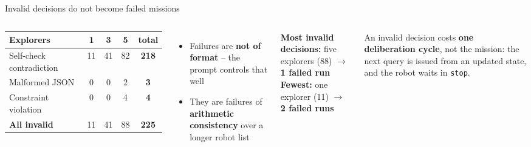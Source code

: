\documentclass[aspectratio=169,10pt]{beamer}
\newcommand{\callout}[2][upmblue]{%
  \begin{beamercolorbox}[wd=\linewidth,sep=6pt,rounded=false]{}%
    \color{#1}\small #2%
  \end{beamercolorbox}%
}
\begin{document}
\begin{frame}{Invalid decisions do not become failed missions}
  \begin{columns}[T]
  \vspace{-2pt}
  \footnotesize
  \begin{tabular}{@{}lcccc@{}}
    \toprule
    \textbf{\color{upmnavy}Explorers} & 1 & 3 & 5 & \textbf{total} \\
    \midrule
    Self-check contradiction & 11 & 41 & 82 & \textbf{218} \\
    Malformed JSON           &  0 &  0 &  2 & \textbf{3}  \\
    Constraint violation     &  0 &  0 &  4 & \textbf{4}  \\
    \midrule
    \textbf{All invalid}     & 11 & 41 & 88 & \textbf{225} \\
    \bottomrule
  \end{tabular}
  \vspace{6pt}
  \begin{itemize}\small
    \item Failures are \textbf{not of format} -- the prompt controls that
      well
    \item They are failures of \textbf{arithmetic consistency} over a
      longer robot list
  \end{itemize}
  \vspace{4pt}
  \callout[upmblue]{\footnotesize \textbf{Most invalid decisions:}
  five explorers (88) $\rightarrow$ \textbf{1 failed run}\\[2pt]
  \textbf{Fewest:} one explorer (11) $\rightarrow$ \textbf{2 failed runs}}
  \vspace{6pt}
  \callout[upmnavy]{\footnotesize An invalid decision costs \textbf{one
  deliberation cycle}, not the mission: the next query is issued from an
  updated state, and the robot waits in \texttt{stop}.}
  \end{columns}
\end{frame}
\end{document}
